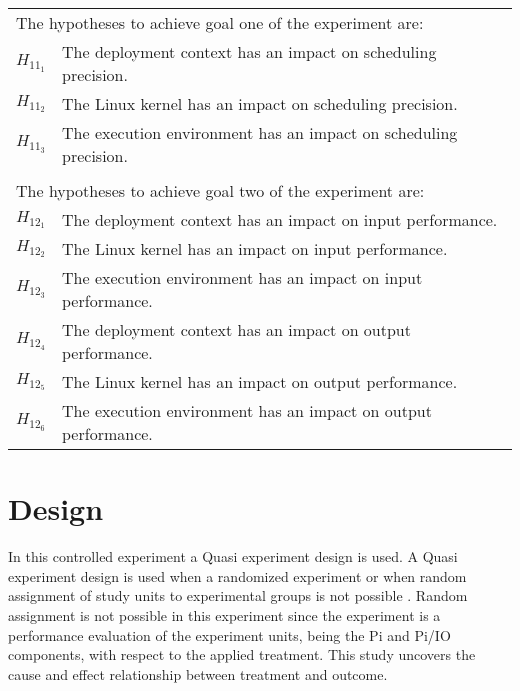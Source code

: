 \begin{table}[H]
\begin{tabular}{l|l}
\multicolumn{2}{l}{The hypotheses to achieve goal one of the experiment are:} \\
$H_{11_{1}}$ & The deployment context has an impact on scheduling precision. \\
$H_{11_{2}}$ & The Linux kernel has an impact on scheduling precision. \\
$H_{11_{3}}$ & The execution environment has an impact on scheduling precision. \\          
\multicolumn{2}{l}{} \\
\multicolumn{2}{l}{The hypotheses to achieve goal two of the experiment are:} \\
$H_{12_{1}}$ & The deployment context has an impact on input performance.\\
$H_{12_{2}}$ & The Linux kernel has an impact on input performance.\\
$H_{12_{3}}$ & The execution environment has an impact on input performance.\\
$H_{12_{4}}$ & The deployment context has an impact on output performance.\\
$H_{12_{5}}$ & The Linux kernel has an impact on output performance.\\
$H_{12_{6}}$ & The execution environment has an impact on output performance.                                                          
\end{tabular}
\end{table}


\section{Design}
In this controlled experiment a Quasi experiment design is used. A Quasi experiment design is used when a randomized experiment or when random assignment of study units to experimental groups is not possible \cite{kampenes}. Random assignment is not possible in this experiment since the experiment is a performance evaluation of the experiment units, being the Pi and Pi/IO components, with respect to the applied treatment. This study uncovers the cause and effect relationship between treatment and outcome. 

